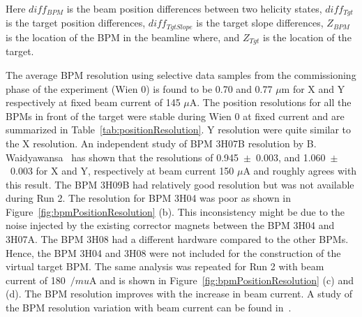Here $diff_{BPM}$ is the beam position differences between two helicity states, $diff_{Tgt}$ is the target position differences, $diff_{TgtSlope}$ is the target slope differences, $Z_{BPM}$ is the location of the BPM in the beamline where, and $Z_{Tgt}$ is the location of the target.

The average BPM resolution using selective data samples from the commissioning phase of the experiment (Wien 0) is found to be 0.70	and 0.77 $\mu$m for X and Y respectively at fixed beam current of 145 $\mu$A. 
The position resolutions for all the BPMs in front of the target were stable during Wien 0 at fixed current and are summarized in Table~\ref{tab:positionResolution}. Y resolution were quite similar to the X resolution. 
An independent study of BPM 3H07B resolution by B. Waidyawansa~\cite{buddhini_resolution} has shown that the resolutions of 0.945~$\pm$~0.003, and 1.060~$\pm$~0.003 for X and Y, respectively at beam current 150 $\mu$A and roughly agrees with this result.
The BPM 3H09B had relatively good resolution but was not available during Run 2. The resolution for BPM 3H04 was poor as shown in Figure~\ref{fig:bpmPositionResolution} (b). This inconsistency might be due to the noise injected by the existing corrector magnets between the BPM 3H04 and 3H07A. 
The BPM 3H08 had a different hardware compared to the other BPMs. Hence, the BPM 3H04 and 3H08 were not included for the construction of the virtual target BPM. 
The same analysis was repeated for Run 2 with beam current of 180~$/mu$A and is shown in Figure~\ref{fig:bpmPositionResolution} (c) and (d). The BPM resolution improves with the increase in beam current. A study of the BPM resolution variation with beam current can be found in~\cite{buddhini_resolution}.

